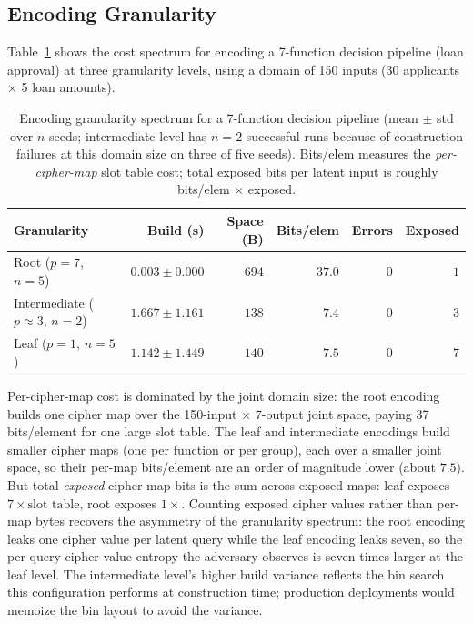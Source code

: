 \documentclass[11pt]{article}
\theoremstyle{definition}
\theoremstyle{plain}
\theoremstyle{remark}
\begin{document}
\subsection{Encoding Granularity}

Table~\ref{tab:granularity} shows the cost spectrum for encoding
a 7-function decision pipeline (loan approval) at three granularity
levels, using a domain of 150 inputs (30 applicants $\times$ 5 loan
amounts).

\begin{table}[ht]
\centering
\caption{Encoding granularity spectrum for a 7-function decision
pipeline (mean $\pm$ std over $n$ seeds; intermediate level has
$n=2$ successful runs because of construction failures at this
domain size on three of five seeds).  Bits/elem measures the
\emph{per-cipher-map} slot table cost; total exposed bits per
latent input is roughly bits/elem $\times$ exposed.}
\label{tab:granularity}
\begin{tabular}{@{}lrrrrr@{}}
\toprule
Granularity & Build (s) & Space (B) & Bits/elem & Errors & Exposed \\
\midrule
Root ($p = 7$, $n=5$) & $0.003 \pm 0.000$ & $694$ & $37.0$ & $0$ & $1$ \\
Intermediate ($p \approx 3$, $n=2$) & $1.667 \pm 1.161$ & $138$ & $7.4$ & $0$ & $3$ \\
Leaf ($p = 1$, $n=5$) & $1.142 \pm 1.449$ & $140$ & $7.5$ & $0$ & $7$ \\
\bottomrule
\end{tabular}
\end{table}

Per-cipher-map cost is dominated by the joint domain size: the root
encoding builds one cipher map over the 150-input $\times$ 7-output
joint space, paying 37 bits/element for one large slot table.  The
leaf and intermediate encodings build smaller cipher maps (one per
function or per group), each over a smaller joint space, so their
per-map bits/element are an order of magnitude lower (about
$7.5$).  But total \emph{exposed} cipher-map bits is the sum across
exposed maps: leaf exposes $7 \times \text{slot table}$, root
exposes $1 \times$.  Counting exposed cipher values rather than
per-map bytes recovers the asymmetry of the granularity spectrum:
the root encoding leaks one cipher value per latent query while the
leaf encoding leaks seven, so the per-query cipher-value entropy
the adversary observes is seven times larger at the leaf level.
The intermediate level's higher build variance reflects the bin
search this configuration performs at construction time; production
deployments would memoize the bin layout to avoid the variance.
\end{document}
